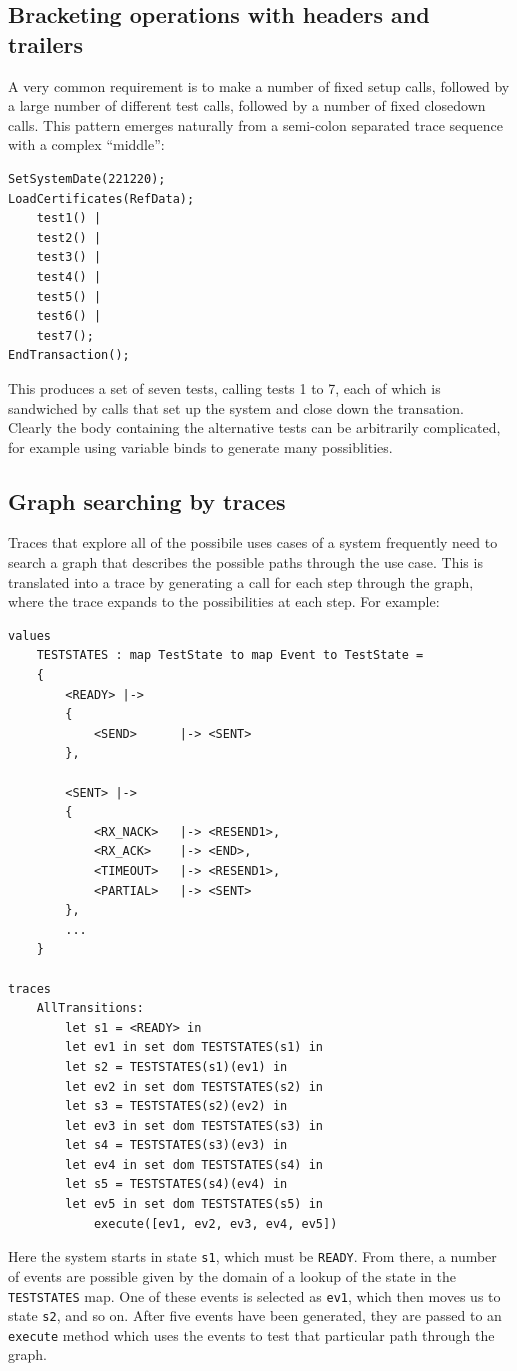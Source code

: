 \documentclass{overturerepchap}
\begin{document}
\subsection{Bracketing operations with headers and trailers}

A very common requirement is to make a number of fixed setup calls,
followed by a large number of different test calls, followed by a number of
fixed closedown calls. This pattern emerges naturally from a semi-colon
separated trace sequence with a complex ``middle'':
\small
\begin{lstlisting}
SetSystemDate(221220);
LoadCertificates(RefData);
	test1() |
	test2() |
	test3() |
	test4() |
	test5() |
	test6() |
	test7();
EndTransaction();
\end{lstlisting}
\normalsize
This produces a set of seven tests, calling tests 1 to 7, each of which is
sandwiched by calls that set up the system and close down the transation.
Clearly the body containing the alternative tests can be arbitrarily
complicated, for example using variable binds to generate many possiblities.

\subsection{Graph searching by traces}

Traces that explore all of the possibile uses cases of a system frequently
need to search a graph that describes the possible paths through the use case.
This is translated into a trace by generating a call for each step through the
graph, where the trace expands to the possibilities at each step. For example:
\scriptsize
\begin{lstlisting}
values
	TESTSTATES : map TestState to map Event to TestState =
	{
		<READY>	|->
		{
			<SEND>		|-> <SENT>
		},

		<SENT> |->
		{
			<RX_NACK>	|-> <RESEND1>,
			<RX_ACK>	|-> <END>,
			<TIMEOUT>	|-> <RESEND1>,
			<PARTIAL>	|-> <SENT>
		},
		...
	}

traces
	AllTransitions:
		let s1 = <READY> in
		let ev1 in set dom TESTSTATES(s1) in
		let s2 = TESTSTATES(s1)(ev1) in
		let ev2 in set dom TESTSTATES(s2) in
		let s3 = TESTSTATES(s2)(ev2) in
		let ev3 in set dom TESTSTATES(s3) in
		let s4 = TESTSTATES(s3)(ev3) in
		let ev4 in set dom TESTSTATES(s4) in
		let s5 = TESTSTATES(s4)(ev4) in
		let ev5 in set dom TESTSTATES(s5) in
			execute([ev1, ev2, ev3, ev4, ev5])
\end{lstlisting}
\normalsize
Here the system starts in state \texttt{s1}, which must be \texttt{READY}. From
there, a number of events are possible given by the domain of a lookup of the
state in the \texttt{TESTSTATES} map. One of these events is selected as
\texttt{ev1}, which then moves us to state \texttt{s2}, and so on. After five
events have been generated, they are passed to an \texttt{execute} method which
uses the events to test that particular path through the graph.
\end{document}
